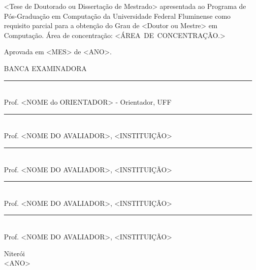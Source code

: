 \noindent
\begin{flushright}
\begin{minipage}[t]{8cm}

<Tese de Doutorado ou Dissertação de Mestrado> apresentada ao Programa de P\'{o}s-Gradua\c{c}\~{a}o em Computa\c{c}\~{a}o da Universidade Federal Fluminense como requisito parcial para a obten\c{c}\~{a}o do \mbox{Grau} de <Doutor ou Mestre> em Computa\c{c}\~{a}o. \'{A}rea de concentra\c{c}\~{a}o: \mbox{<\'AREA DE CONCENTRA\c{C}\~AO.>} %

\end{minipage}
\end{flushright}
\vspace{1.0 cm}
\noindent
Aprovada em <MES> de <ANO>. \\
\begin{flushright}
  {
  \begin{center}
  BANCA EXAMINADORA \\
  \vspace{6mm}
  \rule{11cm}{.1mm} \\
    Prof. <NOME do ORIENTADOR> - Orientador, UFF \\
    \vspace{6mm}
  \rule{11cm}{.1mm} \\
    Prof. <NOME DO AVALIADOR>, <INSTITUI\c{C}\~AO>\\
    \vspace{6mm}
  \rule{11cm}{.1mm} \\
    Prof. <NOME DO AVALIADOR>, <INSTITUI\c{C}\~AO>\\
  \vspace{4mm}
  \rule{11cm}{.1mm} \\
    Prof. <NOME DO AVALIADOR>, <INSTITUI\c{C}\~AO>\\
    \vspace{6mm}
  \rule{11cm}{.1mm} \\
    Prof. <NOME DO AVALIADOR>, <INSTITUI\c{C}\~AO>\\
  \vspace{6mm}
  \end{center}
  }
\end{flushright}
\begin{center}
  \vspace{4mm}
  Niter\'{o}i \\
  <ANO>

\end{center}

